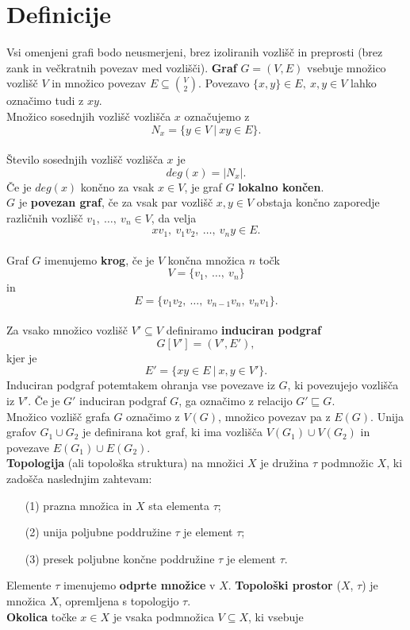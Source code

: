 \documentclass[a4paper, 12pt]{book}
\theoremstyle{definition}
\begin{document}
\section{Definicije}
Vsi omenjeni grafi bodo neusmerjeni, brez izoliranih vozlišč in preprosti (brez zank
in večkratnih povezav med vozlišči).
\textbf{Graf} $G = (V,E)$ vsebuje množico vozlišč $V$ in množico povezav $E \subseteq \binom{V}{2}$.
Povezavo $\{x,y\} \in E,\ x,y \in V$ lahko označimo tudi z $xy$.\\
Množico sosednjih vozlišč vozlišča $x$ označujemo z \[N_x = \{y \in V\ |\ xy \in E\}.\]\\
Število sosednjih vozlišč vozlišča $x$ je \[deg(x) = |N_x|.\] Če je $deg(x)$ končno
za vsak $x \in V$, je graf $G$ \textbf{lokalno končen}.\\
$G$ je \textbf{povezan graf}, če za vsak par vozlišč $x,y \in V$ obstaja končno
zaporedje različnih vozlišč $v_1,\ \dots,\ v_n \in V$, da velja \[xv_1,\ v_1v_2,\ \dots,\ v_n y \in E.\]\\
Graf $G$ imenujemo \textbf{krog}, če je $V$ končna množica $n$ točk \[V=\{v_1,\ \dots,\ v_n\}\] in
\[E=\{v_1 v_2,\ \dots,\ v_{n-1}v_n,\ v_n v_1\}.\] \\
Za vsako množico vozlišč $V' \subseteq V$ definiramo \textbf{induciran podgraf} \[G[V'] = (V',E'),\]
kjer je \[E' = \{xy \in E\ |\ x,y \in V'\}.\] Induciran podgraf potemtakem ohranja vse povezave
iz $G$, ki povezujejo vozlišča iz $V'$. Če je $G'$ induciran podgraf $G$,
ga označimo z relacijo $G' \sqsubseteq  G$.\\
Množico vozlišč grafa $G$ označimo z $V(G)$, množico povezav pa z $E(G)$. Unija
grafov $G_1 \cup G_2$ je definirana kot graf, ki ima vozlišča $V(G_1) \cup V(G_2)$
in povezave $E(G_1) \cup E(G_2)$.\\
\textbf{Topologija} (ali topološka struktura) na množici $X$ je družina $\tau$ podmnožic
$X$, ki zadošča naslednjim zahtevam:
\begin{itemize}
    \item[(1)] prazna množica in $X$ sta elementa $\tau$;
    \item[(2)] unija poljubne poddružine $\tau$ je element $\tau$;
    \item[(3)] presek poljubne končne poddružine $\tau$ je element $\tau$.
\end{itemize}
Elemente $\tau$ imenujemo \textbf{odprte množice} v $X$. \textbf{Topološki prostor}
($X$, $\tau$) je množica $X$, opremljena s topologijo $\tau$.\\
\textbf{Okolica} točke $x \in X$ je vsaka podmnožica $V \subseteq X$, ki vsebuje
\end{document}
